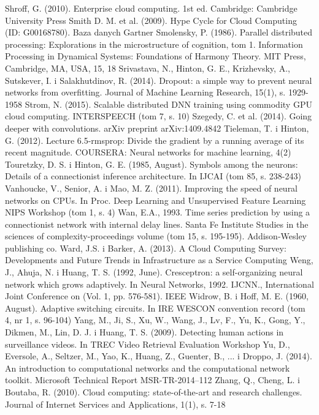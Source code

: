 \documentclass[12pt,a4paper,twoside]{article}
\begin{document}
\begin{thebibliography}{99}
 Shroff, G. (2010). Enterprise cloud computing. 1st ed. Cambridge: Cambridge University Press
 Smith D. M. et al. (2009). Hype Cycle for Cloud Computing (ID: G00168780). Baza danych Gartner
 Smolensky, P. (1986). Parallel distributed processing: Explorations in the microstructure of cognition, tom 1. Information Processing in Dynamical Systems: Foundations of Harmony Theory. MIT Press, Cambridge, MA, USA, 15, 18
 Srivastava, N., Hinton, G. E., Krizhevsky, A., Sutskever, I. i Salakhutdinov, R. (2014). Dropout: a simple way to prevent neural networks from overfitting. Journal of Machine Learning Research, 15(1), s. 1929-1958
 Strom, N. (2015). Scalable distributed DNN training using commodity GPU cloud computing. INTERSPEECH (tom 7, s. 10)
 Szegedy, C. et al. (2014). Going deeper with convolutions. arXiv preprint arXiv:1409.4842
 Tieleman, T. i Hinton, G. (2012). Lecture 6.5-rmsprop: Divide the gradient by a running average of its recent magnitude. COURSERA: Neural networks for machine learning, 4(2)
 Touretzky, D. S. i Hinton, G. E. (1985, August). Symbols among the neurons: Details of a connectionist inference architecture. In IJCAI (tom 85, s. 238-243)
 Vanhoucke, V., Senior, A. i Mao, M. Z. (2011). Improving the speed of neural networks on CPUs. In Proc. Deep Learning and Unsupervised Feature Learning NIPS Workshop (tom 1, s. 4)
 Wan, E.A., 1993. Time series prediction by using a connectionist network with internal delay lines. Santa Fe Institute Studies in the sciences of complexity-proceedings volume (tom 15, s. 195-195). Addison-Wesley publishing co.
 Ward, J.S. i Barker, A. (2013). A Cloud Computing Survey: Developments and Future Trends in Infrastructure as a Service Computing
 Weng, J., Ahuja, N. i Huang, T. S. (1992, June). Cresceptron: a self-organizing neural network which grows adaptively. In Neural Networks, 1992. IJCNN., International Joint Conference on (Vol. 1, pp. 576-581). IEEE
 Widrow, B. i Hoff, M. E. (1960, August). Adaptive switching circuits. In IRE WESCON convention record (tom 4, nr 1, s. 96-104)
 Yang, M., Ji, S., Xu, W., Wang, J., Lv, F., Yu, K., Gong, Y., Dikmen, M., Lin, D. J. i Huang, T. S. (2009). Detecting human actions in surveillance videos. In TREC Video Retrieval Evaluation Workshop
 Yu, D., Eversole, A., Seltzer, M., Yao, K., Huang, Z., Guenter, B., ... i Droppo, J. (2014). An introduction to computational networks and the computational network toolkit. Microsoft Technical Report MSR-TR-2014–112
 Zhang, Q., Cheng, L. i Boutaba, R. (2010). Cloud computing: state-of-the-art and research challenges. Journal of Internet Services and Applications, 1(1), s. 7-18


\end{thebibliography}
\end{document}
